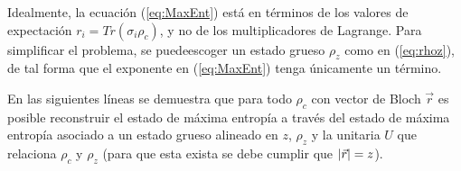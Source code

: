 \documentclass[onecolumn,11pt]{article}
\begin{document}
Idealmente, la ecuación (\ref{eq:MaxEnt}) está en términos de los valores de expectación $r_{i}=Tr(\sigma_{i}\rho_{c})$, y no de los multiplicadores de Lagrange. Para simplificar el problema, se puedeescoger un estado grueso $\rho_{z}$ como en (\ref{eq:rhoz}), de tal forma que el exponente en (\ref{eq:MaxEnt}) tenga únicamente un término.

\vspace{0.2cm}

En las siguientes líneas se demuestra que para todo $\rho_{c}$ con vector de Bloch $\vec{r}$ es posible reconstruir el estado de máxima entropía a través del estado de máxima entropía asociado a un estado grueso alineado en $z$, $\rho_{z}$ y la unitaria $U$ que relaciona $\rho_{c}$ y $\rho_{z}$ (para que esta exista se debe cumplir que $\abs{\vec{r}}=z$).

\vspace{0.2cm}
\end{document}
